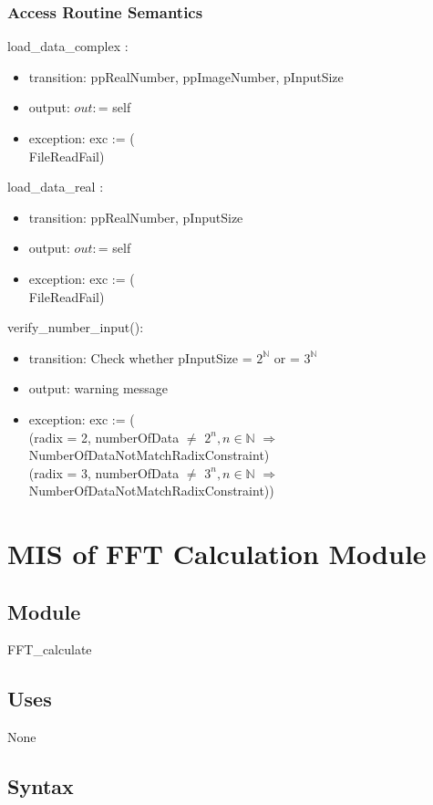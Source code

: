 \documentclass[12pt, titlepage]{article}
\begin{document}
\subsubsection{Access Routine Semantics}

load\_data\_complex :
\begin{itemize}
\item transition: ppRealNumber, ppImageNumber, pInputSize
\item output: $out:$= self
\item exception: exc := (\\
 FileReadFail)
\end{itemize}
load\_data\_real :
\begin{itemize}
\item transition: ppRealNumber, pInputSize
\item output: $out:$= self
\item exception: exc := (\\
 FileReadFail)
\end{itemize}
verify\_number\_input():
\begin{itemize}
\item transition: Check whether pInputSize = $2^{\mathbb{N}}$ or =  $3^{\mathbb{N}}$
\item output: warning message
\item exception: exc := (\\
(radix = 2, numberOfData $\neq$ $2^n, n\in \mathbb{N}$ $\Rightarrow$ NumberOfDataNotMatchRadixConstraint)\\
(radix = 3, numberOfData $\neq$ $3^n, n\in \mathbb{N}$ $\Rightarrow$ NumberOfDataNotMatchRadixConstraint))
\end{itemize}



\section{MIS of FFT Calculation Module} \label{Input} 

\subsection{Module}

FFT\_calculate

\subsection{Uses}
None
\subsection{Syntax}
\end{document}
